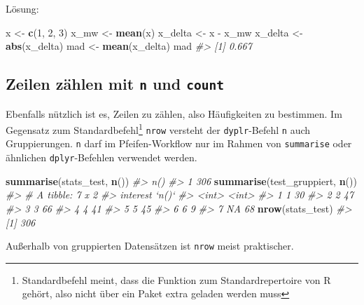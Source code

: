 \documentclass[12pt,ngerman,]{book}
\makeatletter
\newenvironment{Shaded}{\begin{snugshade}}{\end{snugshade}}
\newcommand{\KeywordTok}[1]{\textcolor[rgb]{0.13,0.29,0.53}{\textbf{{#1}}}}
\newcommand{\DecValTok}[1]{\textcolor[rgb]{0.00,0.00,0.81}{{#1}}}
\newcommand{\StringTok}[1]{\textcolor[rgb]{0.31,0.60,0.02}{{#1}}}
\newcommand{\CommentTok}[1]{\textcolor[rgb]{0.56,0.35,0.01}{\textit{{#1}}}}
\newcommand{\NormalTok}[1]{{#1}}
\let\rmarkdownfootnote\footnote%
\def\footnote{\protect\rmarkdownfootnote}
\newenvironment{kframe}{%
\medskip{}
\setlength{\fboxsep}{.8em}
 \def\at@end@of@kframe{}%
 \ifinner\ifhmode%
  \def\at@end@of@kframe{\end{minipage}}%
  \begin{minipage}{\columnwidth}%
 \fi\fi%
 \def\FrameCommand##1{\hskip\@totalleftmargin \hskip-\fboxsep
 \colorbox{shadecolor}{##1}\hskip-\fboxsep
     \hskip-\linewidth \hskip-\@totalleftmargin \hskip\columnwidth}%
 \MakeFramed {\advance\hsize-\width
   \@totalleftmargin\z@ \linewidth\hsize
   \@setminipage}}%
 {\par\unskip\endMakeFramed%
 \at@end@of@kframe}
\renewenvironment{Shaded}{\begin{kframe}}{\end{kframe}}
\theoremstyle{definition}
\theoremstyle{definition}
\theoremstyle{remark}
\makeatother
\begin{document}
Lösung:

\begin{Shaded}
\begin{Highlighting}[]
\NormalTok{x <-}\StringTok{ }\KeywordTok{c}\NormalTok{(}\DecValTok{1}\NormalTok{, }\DecValTok{2}\NormalTok{, }\DecValTok{3}\NormalTok{)}
\NormalTok{x_mw <-}\StringTok{ }\KeywordTok{mean}\NormalTok{(x)}
\NormalTok{x_delta <-}\StringTok{ }\NormalTok{x -}\StringTok{ }\NormalTok{x_mw}
\NormalTok{x_delta <-}\StringTok{ }\KeywordTok{abs}\NormalTok{(x_delta)}
\NormalTok{mad <-}\StringTok{ }\KeywordTok{mean}\NormalTok{(x_delta)}
\NormalTok{mad}
\CommentTok{#> [1] 0.667}
\end{Highlighting}
\end{Shaded}

\subsection{\texorpdfstring{Zeilen zählen mit \texttt{n} und
\texttt{count}}{Zeilen zählen mit n und count}}\label{zeilen-zahlen-mit-n-und-count}

Ebenfalls nützlich ist es, Zeilen zu zählen, also Häufigkeiten zu
bestimmen. Im Gegensatz zum Standardbefehl\footnote{Standardbefehl
  meint, dass die Funktion zum Standardrepertoire von R gehört, also
  nicht über ein Paket extra geladen werden muss} \texttt{nrow} versteht
der \texttt{dyplr}-Befehl \texttt{n} auch Gruppierungen.
\texttt{n} darf im Pfeifen-Workflow nur im Rahmen von \texttt{summarise}
oder ähnlichen \texttt{dplyr}-Befehlen verwendet werden.

\begin{Shaded}
\begin{Highlighting}[]
\KeywordTok{summarise}\NormalTok{(stats_test, }\KeywordTok{n}\NormalTok{())}
\CommentTok{#>   n()}
\CommentTok{#> 1 306}
\KeywordTok{summarise}\NormalTok{(test_gruppiert, }\KeywordTok{n}\NormalTok{())}
\CommentTok{#> # A tibble: 7 x 2}
\CommentTok{#>   interest `n()`}
\CommentTok{#>      <int> <int>}
\CommentTok{#> 1        1    30}
\CommentTok{#> 2        2    47}
\CommentTok{#> 3        3    66}
\CommentTok{#> 4        4    41}
\CommentTok{#> 5        5    45}
\CommentTok{#> 6        6     9}
\CommentTok{#> 7       NA    68}
\KeywordTok{nrow}\NormalTok{(stats_test)}
\CommentTok{#> [1] 306}
\end{Highlighting}
\end{Shaded}

Außerhalb von gruppierten Datensätzen ist \texttt{nrow} meist
praktischer.
\end{document}
